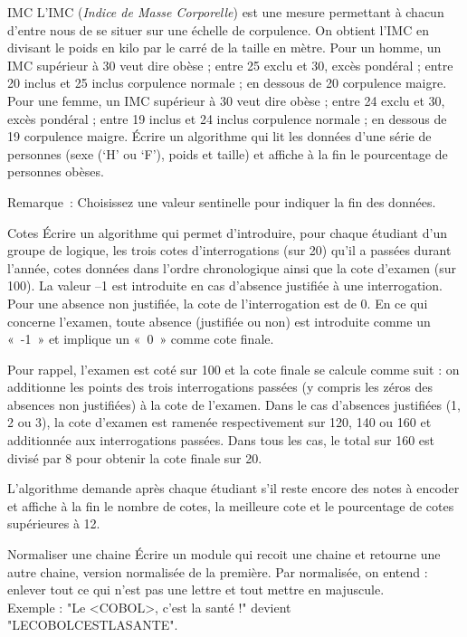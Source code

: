 \begin{Exercice}{IMC}
	L’IMC (\textit{Indice de Masse Corporelle}) est une mesure permettant à
	chacun d’entre nous de se situer sur une échelle de corpulence. On
	obtient l’IMC en divisant le poids en kilo par le carré de la taille en
	mètre. Pour un homme, un IMC supérieur à 30 veut dire obèse ; entre 25
	exclu et 30, excès pondéral ; entre 20 inclus et 25 inclus corpulence
	normale ; en dessous de 20 corpulence maigre. Pour une femme, un IMC
	supérieur à 30 veut dire obèse ; entre 24 exclu et 30, excès pondéral ;
	entre 19 inclus et 24 inclus corpulence normale ; en dessous de 19
	corpulence maigre. Écrire un algorithme qui lit les données d’une série
	de personnes (sexe (‘H’ ou ‘F’), poids et taille) et affiche à la fin
	le pourcentage de personnes obèses.

	Remarque~: Choisissez une valeur sentinelle pour indiquer la fin des
	données.
\end{Exercice}

\begin{Exercice}{Cotes}
	Écrire un algorithme qui permet d’introduire,
	pour chaque étudiant d’un groupe de logique, les trois cotes
	d’interrogations (sur 20) qu’il a passées durant l’année, cotes données
	dans l’ordre chronologique ainsi que la cote d'examen
	(sur 100). La valeur –1 est introduite en cas d’absence justifiée à une
	interrogation. Pour une absence non justifiée, la cote de
	l’interrogation est de 0. En ce qui concerne l'examen,
	toute absence (justifiée ou non) est introduite comme un «~-1~» et
	implique un «~0~» comme cote finale.
	
	Pour rappel, l’examen est coté sur 100 et la cote finale se calcule
	comme suit : on additionne les points des trois interrogations passées
	(y compris les zéros des absences non justifiées) à la cote de
	l’examen. Dans le cas d’absences justifiées (1, 2 ou 3), la cote
	d’examen est ramenée respectivement sur 120, 140 ou 160 et additionnée
	aux interrogations passées. Dans tous les cas, le total sur 160 est
	divisé par 8 pour obtenir la cote finale sur 20.
	
	L'algorithme demande après chaque étudiant
	s'il reste encore des notes à encoder et affiche à la
	fin le nombre de cotes, la meilleure cote et le pourcentage de cotes
	supérieures à 12.
\end{Exercice}

\begin{Exercice}{Normaliser une chaine}
	Écrire un module qui recoit une chaine et retourne une autre chaine,
	version normalisée de la première.
	Par normalisée, on entend : enlever tout ce qui n'est pas une lettre 
	et tout mettre en majuscule.
	\\Exemple : "Le <COBOL>, c'est la santé !" devient "LECOBOLCESTLASANTE".
\end{Exercice}

